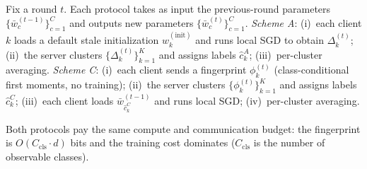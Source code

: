 \begin{definition}[Protocols]
\label{def:protocols}
Fix a round $t$. Each protocol takes as input the previous-round parameters $\{\bar w_c^{(t-1)}\}_{c=1}^C$ and outputs new parameters $\{\bar w_c^{(t)}\}_{c=1}^C$.
\emph{Scheme A}: (i)~each client $k$ loads a default stale initialization $w_k^{(\text{init})}$ and runs local SGD to obtain $\Delta_k^{(t)}$; (ii)~the server clusters $\{\Delta_k^{(t)}\}_{k=1}^K$ and assigns labels $\hat c_k^A$; (iii)~per-cluster averaging.
\emph{Scheme C}: (i)~each client sends a fingerprint $\phi_k^{(t)}$ (class-conditional first moments, no training); (ii)~the server clusters $\{\phi_k^{(t)}\}_{k=1}^K$ and assigns labels $\hat c_k^C$; (iii)~each client loads $\bar w_{\hat c_k^C}^{(t-1)}$ and runs local SGD; (iv)~per-cluster averaging.
\end{definition}

Both protocols pay the same compute and communication budget: the fingerprint is $O(C_{\mathrm{cls}} \cdot d)$ bits and the training cost dominates ($C_{\mathrm{cls}}$ is the number of observable classes).


